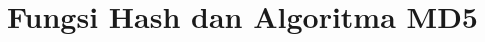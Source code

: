 \documentclass[../main.tex]{subfiles}
\begin{document}
\chapter{Fungsi Hash dan Algoritma MD5}
\end{document}

